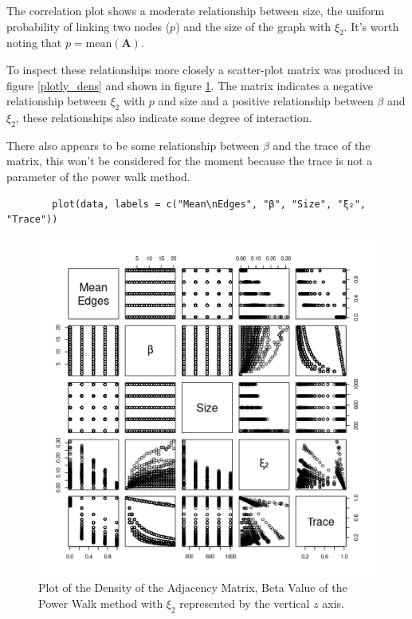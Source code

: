 \documentclass[11pt]{report}
\begin{document}
The correlation plot shows a moderate relationship between size, the uniform probability of linking two nodes (\(p\)) and the size of the graph with \(\xi_{2}\). It's worth noting that \(p = \mathrm{mean}\left(\mathbf{A}\right)\).

To inspect these relationships more closely a scatter-plot matrix was produced in
figure \ref{plotly_dens} and shown in figure \ref{fig:plotly_dens}. The matrix indicates a
negative relationship between \(\xi_{2}\) with \(p\) and size and a positive
relationship between \(\beta\) and \(\xi_{2}\), these relationships also indicate some degree of interaction.


There also appears to be some relationship between \(\beta\) and the trace of the matrix, this won't be considered for the moment because the trace is not a parameter of the power walk method.

\begin{listing}[htbp]
    \begin{tcolorbox}
        \begin{verbatim}
        plot(data, labels = c("Mean\nEdges", "β", "Size", "ξ₂", "Trace"))
        \end{verbatim}
    \end{tcolorbox}
\caption{\label{plotly_dens} Plot Model Diagnostics for data corresponding to graphs, see figure \ref{fig:plotly_dens}}
\end{listing}


\begin{figure}[htbp]
\centering
\includegraphics[width=12cm]{media/cor_matrix-er.png}
\caption{\label{fig:plotly_dens}Plot of the Density of the Adjacency Matrix, Beta Value of the Power Walk method with \(\xi_{2}\) represented by the vertical \(z\) axis.}
\end{figure}
\end{document}
